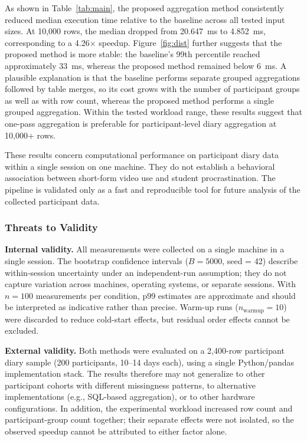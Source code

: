 As shown in Table~\ref{tab:main}, the proposed aggregation method consistently reduced median execution time relative to the baseline across all tested input sizes. At 10{,}000 rows, the median dropped from 20.647~ms to 4.852~ms, corresponding to a 4.26$\times$ speedup. Figure~\ref{fig:dist} further suggests that the proposed method is more stable: the baseline's 99th percentile reached approximately 33~ms, whereas the proposed method remained below 6~ms. A plausible explanation is that the baseline performs separate grouped aggregations followed by table merges, so its cost grows with the number of participant groups as well as with row count, whereas the proposed method performs a single grouped aggregation. Within the tested workload range, these results suggest that one-pass aggregation is preferable for participant-level diary aggregation at 10{,}000+ rows.

These results concern computational performance on participant diary data within a single session on one machine. They do not establish a behavioral association between short-form video use and student procrastination. The pipeline is validated only as a fast and reproducible tool for future analysis of the collected participant data.

\subsubsection{Threats to Validity}

\textbf{Internal validity.} All measurements were collected on a single machine in a single session. The bootstrap confidence intervals ($B = 5000$, seed = 42) describe within-session uncertainty under an independent-run assumption; they do not capture variation across machines, operating systems, or separate sessions. With $n = 100$ measurements per condition, p99 estimates are approximate and should be interpreted as indicative rather than precise. Warm-up runs ($n_{\text{warmup}} = 10$) were discarded to reduce cold-start effects, but residual order effects cannot be excluded.

\textbf{External validity.} Both methods were evaluated on a 2,400-row participant diary sample (200 participants, 10--14 days each), using a single Python/pandas implementation stack. The results therefore may not generalize to other participant cohorts with different missingness patterns, to alternative implementations (e.g., SQL-based aggregation), or to other hardware configurations. In addition, the experimental workload increased row count and participant-group count together; their separate effects were not isolated, so the observed speedup cannot be attributed to either factor alone.

